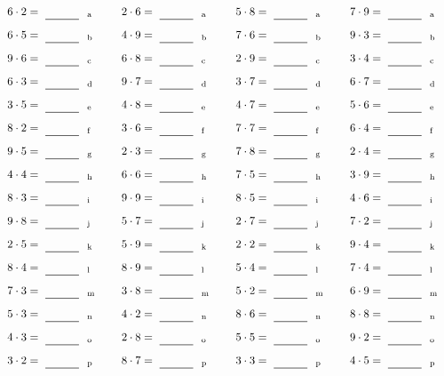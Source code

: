 \documentclass
[
  draft    = true,
  fontsize = 11pt,
  parskip  = half-
]
{scrartcl}
\begin{document}
\par\vfill\par
\begin{align*}
    \pline{6\cdot2}&=\rline{a}
  & \pline{2\cdot6}&=\rline{a}
  & \pline{5\cdot8}&=\rline{a}
  & \pline{7\cdot9}&=\rline{a} \\[1ex]
    \pline{6\cdot5}&=\rline{b}
  & \pline{4\cdot9}&=\rline{b}
  & \pline{7\cdot6}&=\rline{b}
  & \pline{9\cdot3}&=\rline{b} \\[1ex]
    \pline{9\cdot6}&=\rline{c}
  & \pline{6\cdot8}&=\rline{c}
  & \pline{2\cdot9}&=\rline{c}
  & \pline{3\cdot4}&=\rline{c} \\[1ex]
    \pline{6\cdot3}&=\rline{d}
  & \pline{9\cdot7}&=\rline{d}
  & \pline{3\cdot7}&=\rline{d}
  & \pline{6\cdot7}&=\rline{d} \\[1ex]
    \pline{3\cdot5}&=\rline{e}
  & \pline{4\cdot8}&=\rline{e}
  & \pline{4\cdot7}&=\rline{e}
  & \pline{5\cdot6}&=\rline{e} \\[1ex]
    \pline{8\cdot2}&=\rline{f}
  & \pline{3\cdot6}&=\rline{f}
  & \pline{7\cdot7}&=\rline{f}
  & \pline{6\cdot4}&=\rline{f} \\[1ex]
    \pline{9\cdot5}&=\rline{g}
  & \pline{2\cdot3}&=\rline{g}
  & \pline{7\cdot8}&=\rline{g}
  & \pline{2\cdot4}&=\rline{g} \\[1ex]
    \pline{4\cdot4}&=\rline{h}
  & \pline{6\cdot6}&=\rline{h}
  & \pline{7\cdot5}&=\rline{h}
  & \pline{3\cdot9}&=\rline{h} \\[1ex]
    \pline{8\cdot3}&=\rline{i}
  & \pline{9\cdot9}&=\rline{i}
  & \pline{8\cdot5}&=\rline{i}
  & \pline{4\cdot6}&=\rline{i} \\[1ex]
    \pline{9\cdot8}&=\rline{j}
  & \pline{5\cdot7}&=\rline{j}
  & \pline{2\cdot7}&=\rline{j}
  & \pline{7\cdot2}&=\rline{j} \\[1ex]
    \pline{2\cdot5}&=\rline{k}
  & \pline{5\cdot9}&=\rline{k}
  & \pline{2\cdot2}&=\rline{k}
  & \pline{9\cdot4}&=\rline{k} \\[1ex]
    \pline{8\cdot4}&=\rline{l}
  & \pline{8\cdot9}&=\rline{l}
  & \pline{5\cdot4}&=\rline{l}
  & \pline{7\cdot4}&=\rline{l} \\[1ex]
    \pline{7\cdot3}&=\rline{m}
  & \pline{3\cdot8}&=\rline{m}
  & \pline{5\cdot2}&=\rline{m}
  & \pline{6\cdot9}&=\rline{m} \\[1ex]
    \pline{5\cdot3}&=\rline{n}
  & \pline{4\cdot2}&=\rline{n}
  & \pline{8\cdot6}&=\rline{n}
  & \pline{8\cdot8}&=\rline{n} \\[1ex]
    \pline{4\cdot3}&=\rline{o}
  & \pline{2\cdot8}&=\rline{o}
  & \pline{5\cdot5}&=\rline{o}
  & \pline{9\cdot2}&=\rline{o} \\[1ex]
    \pline{3\cdot2}&=\rline{p}
  & \pline{8\cdot7}&=\rline{p}
  & \pline{3\cdot3}&=\rline{p}
  & \pline{4\cdot5}&=\rline{p}
\end{align*}
\end{document}
